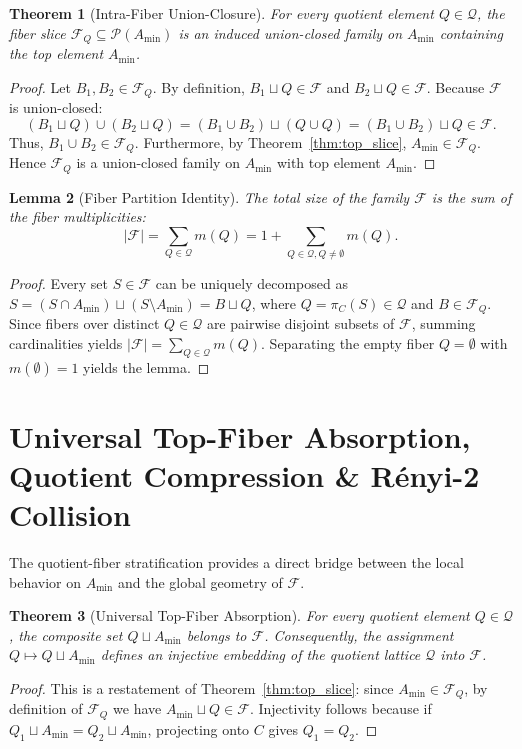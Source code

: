 \documentclass[11pt,a4paper]{article}
\theoremstyle{plain}
\newtheorem{theorem}{Theorem}[section]
\newtheorem{lemma}[theorem]{Lemma}
\theoremstyle{definition}
\theoremstyle{remark}
\newcommand{\F}{\mathcal{F}}
\newcommand{\Q}{\mathcal{Q}}
\begin{document}
\begin{theorem}[Intra-Fiber Union-Closure]\label{thm:intra_uc}
For every quotient element $Q \in \Q$, the fiber slice $\F_Q \subseteq \mathcal{P}(A_{\min})$ is an induced union-closed family on $A_{\min}$ containing the top element $A_{\min}$.
\end{theorem}
\begin{proof}
Let $B_1, B_2 \in \F_Q$. By definition, $B_1 \sqcup Q \in \F$ and $B_2 \sqcup Q \in \F$. Because $\F$ is union-closed:
\begin{equation}
(B_1 \sqcup Q) \cup (B_2 \sqcup Q) = (B_1 \cup B_2) \sqcup (Q \cup Q) = (B_1 \cup B_2) \sqcup Q \in \F.
\end{equation}
Thus, $B_1 \cup B_2 \in \F_Q$. Furthermore, by Theorem~\ref{thm:top_slice}, $A_{\min} \in \F_Q$. Hence $\F_Q$ is a union-closed family on $A_{\min}$ with top element $A_{\min}$.
\end{proof}

\begin{lemma}[Fiber Partition Identity]\label{lem:partition}
The total size of the family $\F$ is the sum of the fiber multiplicities:
\begin{equation}
|\F| = \sum_{Q \in \Q} m(Q) = 1 + \sum_{Q \in \Q, Q \ne \emptyset} m(Q).
\end{equation}
\end{lemma}
\begin{proof}
Every set $S \in \F$ can be uniquely decomposed as $S = (S \cap A_{\min}) \sqcup (S \setminus A_{\min}) = B \sqcup Q$, where $Q = \pi_C(S) \in \Q$ and $B \in \F_Q$. Since fibers over distinct $Q \in \Q$ are pairwise disjoint subsets of $\F$, summing cardinalities yields $|\F| = \sum_{Q \in \Q} m(Q)$. Separating the empty fiber $Q = \emptyset$ with $m(\emptyset) = 1$ yields the lemma.
\end{proof}

\section{Universal Top-Fiber Absorption, Quotient Compression \& Rényi-2 Collision}\label{sec:absorption}

The quotient-fiber stratification provides a direct bridge between the local behavior on $A_{\min}$ and the global geometry of $\F$.

\begin{theorem}[Universal Top-Fiber Absorption]\label{thm:absorption}
For every quotient element $Q \in \Q$, the composite set $Q \sqcup A_{\min}$ belongs to $\F$. Consequently, the assignment $Q \mapsto Q \sqcup A_{\min}$ defines an injective embedding of the quotient lattice $\Q$ into $\F$.
\end{theorem}
\begin{proof}
This is a restatement of Theorem~\ref{thm:top_slice}: since $A_{\min} \in \F_Q$, by definition of $\F_Q$ we have $A_{\min} \sqcup Q \in \F$. Injectivity follows because if $Q_1 \sqcup A_{\min} = Q_2 \sqcup A_{\min}$, projecting onto $C$ gives $Q_1 = Q_2$.
\end{proof}
\end{document}
